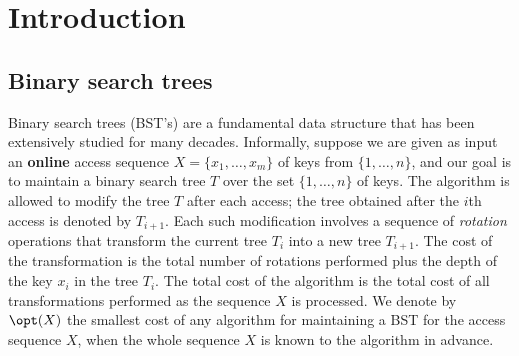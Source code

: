 \else 
\def\julia#1{} 
\def\parinya#1{} 
\def\thatchaphol#1{} 
\def\julia#1{} 
\newcommand{\mynote}[2][red]{} 
%


\fi 



%

%

\section{Introduction}

\subsection{Binary search trees} 

Binary search trees (BST's) are a fundamental data structure that has been extensively studied for many decades.
Informally, suppose we are given as input an {\bf online} access sequence $X=\{x_{1},\ldots,x_{m}\}$ of keys from $\{1,\ldots,n\}$, and our goal is to maintain a binary search tree $T$ over the set $\{1,\ldots,n\}$ of keys. 
The algorithm is allowed to modify the tree $T$ after each access; the tree obtained after the $i$th access is denoted by $T_{i+1}$. 
Each such modification involves a sequence of \emph{rotation} operations that transform the current tree $T_i$ into a new tree $T_{i+1}$. 
The cost of the transformation is the total number of rotations performed plus the depth of the key $x_i$ in the tree $T_i$. 
The total cost of the algorithm is the total cost of all transformations performed as the sequence $X$ is processed. 
We denote by $\opt(X)$ the smallest cost of any algorithm for maintaining a BST for the access sequence $X$, when  the whole sequence $X$ is known to the algorithm in advance.




